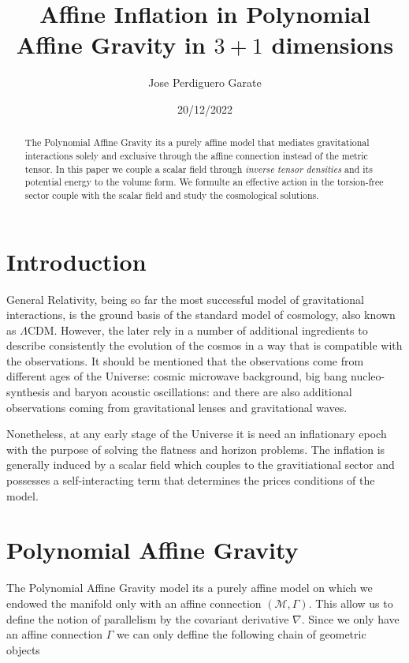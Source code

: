 \documentclass[10pt,a4paper]{article}
\title{Affine Inflation in Polynomial Affine Gravity in $3+1$ dimensions}
\author{Jose Perdiguero Garate}
\date{20/12/2022}
\begin{document}
\maketitle

\begin{abstract}
  The Polynomial Affine Gravity its a purely affine model that mediates gravitational interactions solely and exclusive through the
  affine connection instead of the metric tensor. In this paper we couple a scalar field through \textit{inverse tensor densities} and 
  its potential energy to the volume form. We formulte an effective action in the torsion-free sector couple with the scalar field and
  study the cosmological solutions.
\end{abstract}

\tableofcontents

\section{Introduction}

General Relativity, being so far the most successful model of gravitational interactions, is the ground basis of the standard model 
of cosmology, also known as $\Lambda$CDM. However, the later rely in a number of additional ingredients to describe consistently the evolution
of the cosmos in a way that is compatible with the observations. It should be mentioned that the observations come from different ages of the Universe:
cosmic microwave background, big bang nucleo-synthesis and baryon acoustic oscillations: and there are also additional observations coming from 
gravitational lenses and gravitational waves.

Nonetheless, at any early stage of the Universe it is need an inflationary epoch with the purpose of solving the flatness and horizon problems. The
inflation is generally induced by a scalar field which couples to the gravitiational sector and possesses a self-interacting term that
determines the prices conditions of the model.

\section{Polynomial Affine Gravity}

The Polynomial Affine Gravity model its a purely affine model on which we endowed the manifold only with an affine connection 
$(\mathcal{M}, \Gamma)$. This allow us to define the notion of parallelism by the covariant derivative $\nabla$. Since we only
have an affine connection $\Gamma$ we can only deffine the following chain of geometric objects
\end{document}
